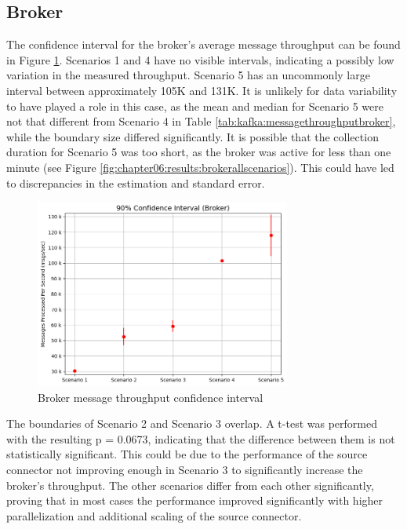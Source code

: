 \subsection{Broker}
The confidence interval for the broker's average message throughput can be found in Figure \ref{fig:chapter07:discussion:brokermessageci}. Scenarios 1 and 4 have no visible intervals, indicating a possibly low variation in the measured throughput. Scenario 5 has an uncommonly large interval between approximately 105K and 131K. It is unlikely for data variability to have played a role in this case, as the mean and median for Scenario 5 were not that different from Scenario 4 in Table \ref{tab:kafka:messagethroughputbroker}, while the boundary size differed significantly. It is possible that the collection duration for Scenario 5 was too short, as the broker was active for less than one minute (see Figure \ref{fig:chapter06:results:brokerallscenarios}). This could have led to discrepancies in the estimation and standard error.

\begin{figure}[htbp]
    \centering
    \includegraphics[width=0.75\textwidth]{chapters/images/confidence-intervals/broker-message-ci.png}
    \caption{Broker message throughput confidence interval}
    \label{fig:chapter07:discussion:brokermessageci}
\end{figure}

The boundaries of Scenario 2 and Scenario 3 overlap. A t-test was performed with the resulting p = 0.0673, indicating that the difference between them is not statistically significant. This could be due to the performance of the source connector not improving enough in Scenario 3 to significantly increase the broker's throughput. The other scenarios differ from each other significantly, proving that in most cases the performance improved significantly with higher parallelization and additional scaling of the source connector.

